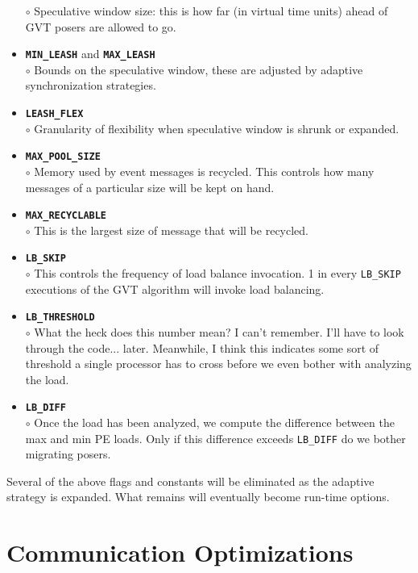 \documentclass[10pt]{article}
\begin{document}
\begin{itemize}
	$\circ$ Speculative window size: this is how far (in virtual time units) ahead of GVT posers are allowed to go.\\
\item {\tt {\bf MIN\_LEASH}} and {\tt {\bf MAX\_LEASH}}\\
	$\circ$ Bounds on the speculative window, these are adjusted by adaptive synchronization strategies.\\
\item {\tt {\bf LEASH\_FLEX}}\\
	$\circ$ Granularity of flexibility when speculative window is shrunk or expanded.\\
\item {\tt {\bf MAX\_POOL\_SIZE}}\\
	$\circ$ Memory used by event messages is recycled.  This controls how many messages of a particular size will be kept on hand.
\item {\tt {\bf MAX\_RECYCLABLE}}\\
	$\circ$ This is the largest size of message that will be recycled.
\item {\tt {\bf LB\_SKIP}}\\
	$\circ$ This controls the frequency of load balance invocation.  1 in every {\tt LB\_SKIP} executions of the GVT algorithm will invoke load balancing.
\item {\tt {\bf LB\_THRESHOLD}}\\
	$\circ$ What the heck does this number mean?  I can't remember.  I'll have to look through the code... later.  Meanwhile, I think this indicates some sort of threshold a single processor has to cross before we even bother with analyzing the load.\\
\item {\tt {\bf LB\_DIFF}}\\
	$\circ$ Once the load has been analyzed, we compute the difference between the max and min PE loads.  Only if this difference exceeds {\tt LB\_DIFF} do we bother migrating posers.\\
\end{itemize}

Several of the above flags and constants will be eliminated as the adaptive strategy is expanded.  What remains will eventually become run-time options.

\section{Communication Optimizations}
\end{document}
